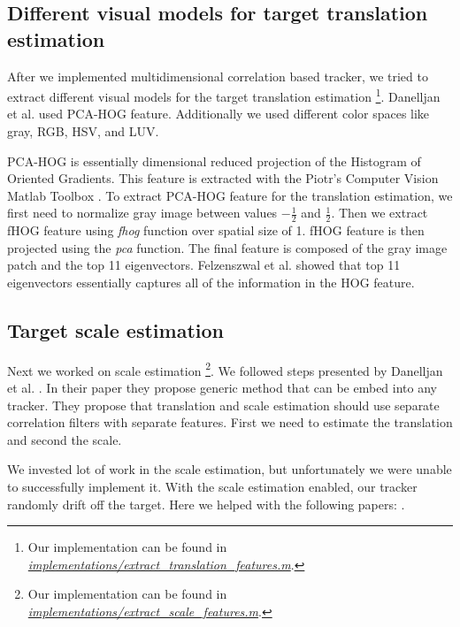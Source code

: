 \documentclass[runningheads]{llncs}
\begin{document}
\subsection{Different visual models for target translation estimation}
After we implemented multidimensional correlation based tracker, we tried to extract different visual models for the target translation estimation \footnote{Our implementation can be found in \href{https://github.com/matjazmav/fri-1819-nmrv-seminar/blob/master/implementations/extract_translation_features.m}{\textit{implementations/\-extract\_translation\_features.m}}.}. Danelljan et al. \cite{danelljan2014accurate} used PCA-HOG feature. Additionally we used different color spaces like gray, RGB, HSV, and LUV.

PCA-HOG is essentially dimensional reduced projection of the Histogram of Oriented Gradients. This feature is extracted with the Piotr's Computer Vision Matlab Toolbox \cite{PMT}. To extract PCA-HOG feature for the translation estimation, we first need to normalize gray image between values $-\frac{1}{2}$ and $\frac{1}{2}$. Then we extract fHOG feature using \textit{fhog} function over spatial size of 1. fHOG feature is then projected using the \textit{pca} function. The final feature is composed of the gray image patch and the top 11 eigenvectors. Felzenszwal et al. \cite{felzenszwalb2009object} showed that top 11 eigenvectors essentially captures all of the information in the HOG feature. 

\subsection{Target scale estimation}

Next we worked on scale estimation \footnote{Our implementation can be found in \href{https://github.com/matjazmav/fri-1819-nmrv-seminar/blob/master/implementations/\-extract_scale_features.m}{\textit{implementations/extract\_scale\_features.m}}.}. We followed steps presented by Danelljan et al. \cite{danelljan2014accurate}. In their paper they propose generic method that can be embed into any tracker. They propose that translation and scale estimation should use separate correlation filters with separate features. First we need to estimate the translation and second the scale. 

We invested lot of work in the scale estimation, but unfortunately we were unable to successfully implement it. With the scale estimation enabled, our tracker randomly drift off the target. Here we helped with the following papers: \cite{danelljan2014accurate,chen2015experimental,zhang2018visual}.
\end{document}
